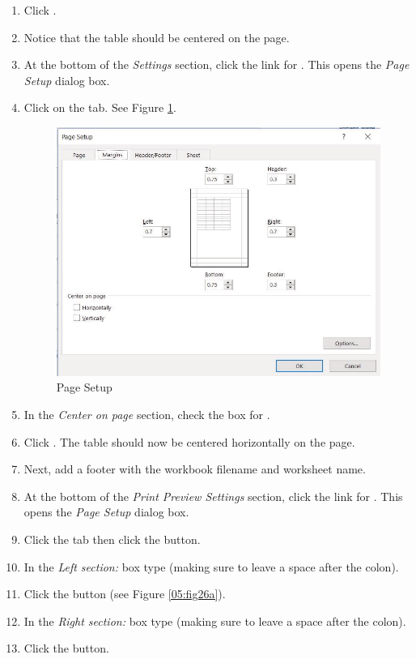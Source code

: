 \begin{enumbox}
	\begin{enumerate}
		\item Click .
		\item Notice that the table should be centered on the page.
		\item At the bottom of the \textit{Settings} section, click the link for . This opens the \textit{Page Setup} dialog box. 
		\item Click on the  tab. See Figure \ref{05:fig26}.
	
		\begin{figure}[H]
			\centering
			\includegraphics[width=\maxwidth{.95\linewidth}]{gfx/ch05_fig26}
			\caption{Page Setup}
			\label{05:fig26}
		\end{figure}

		\item In the \textit{Center on page} section, check the box for .
		\item Click . The table should now be centered horizontally on the page.
		\item Next, add a footer with the workbook filename and worksheet name.
		\item At the bottom of the \textit{Print Preview Settings} section, click the link for . This opens the \textit{Page Setup} dialog box.	
		\item Click the  tab then click the  button.
		\item In the \textit{Left section:} box type  (making sure to leave a space after the colon).
		\item Click the  button (see Figure \ref{05:fig26a}).
		\item In the \textit{Right section:} box type  (making sure to leave a space after the colon).
		\item Click the  button.
		

\end{enumerate}
\end{enumbox}
